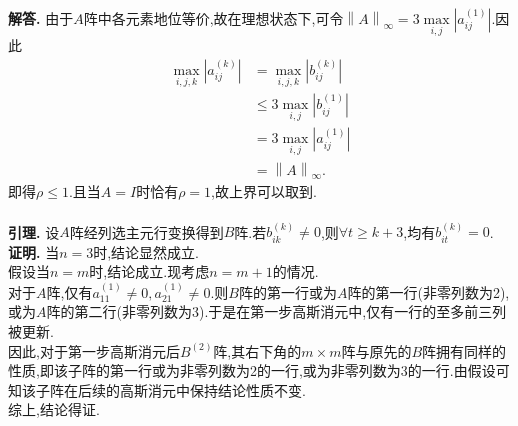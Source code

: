 \documentclass[12pt, a4paper, oneside, UTF8]{ctexart}
\newenvironment{solution}{\par\noindent\textbf{解答. }}{\par}
\begin{document}
\begin{solution}
    由于$A$阵中各元素地位等价,故在理想状态下,可令${\left\lVert{A}\right\rVert}_{\infty}={3\max\limits_{i,j}{|a_{ij}^{(1)}|}}$.因此
    \begin{align*}
        \max\limits_{i,j,k}{|{a_{ij}^{(k)}}|}&=\max\limits_{i,j,k}{|{b_{ij}^{(k)}}|}\\
        &\leq{3\max\limits_{i,j}{|b_{ij}^{(1)}|}}\\
        &={3\max\limits_{i,j}{|a_{ij}^{(1)}|}}\\
        &={\left\lVert{A}\right\rVert}_{\infty}.
    \end{align*}
    即得$\rho\leq{1}$.且当$A=I$时恰有$\rho=1$,故上界可以取到.\\\\
    \textbf{引理.}
    设$A$阵经列选主元行变换得到$B$阵.若$b_{ik}^{(k)}\neq{0}$,则$\forall{t\geq{k+3}}$,均有$b_{it}^{(k)}=0$.\\
    \textbf{证明.} 
    当$n=3$时,结论显然成立.\\
    假设当$n=m$时,结论成立.现考虑$n=m+1$的情况.\\
    对于$A$阵,仅有$a_{11}^{(1)}\neq{0},a_{21}^{(1)}\neq{0}$.则$B$阵的第一行或为$A$阵的第一行(非零列数为2),或为$A$阵的第二行(非零列数为3).于是在第一步高斯消元中,仅有一行的至多前三列被更新.\\
    因此,对于第一步高斯消元后$B^{(2)}$阵,其右下角的${m}\times{m}$阵与原先的$B$阵拥有同样的性质,即该子阵的第一行或为非零列数为2的一行,或为非零列数为3的一行.由假设可知该子阵在后续的高斯消元中保持结论性质不变.\\
    综上,结论得证.
\end{solution}
\newpage
\end{document}
